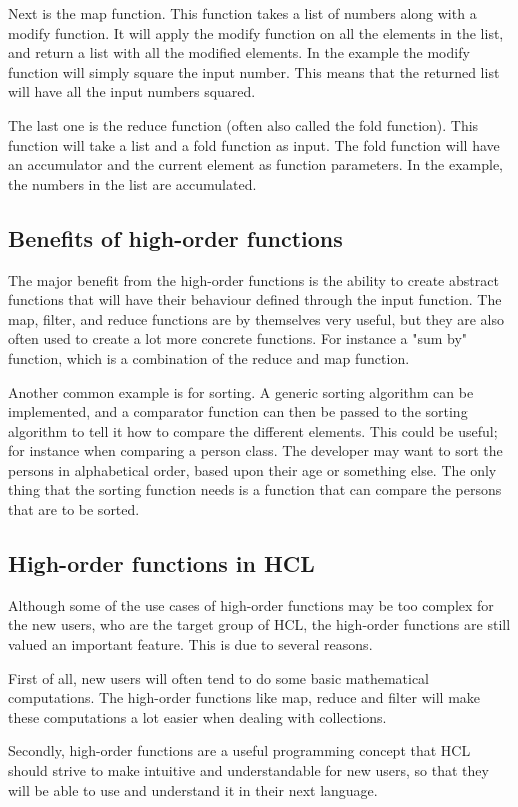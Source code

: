 Next is the map function. 
This function takes a list of numbers along with a modify function. 
It will apply the modify function on all the elements in the list, and return a list with all the modified elements.
In the example the modify function will simply square the input number. 
This means that the returned list will have all the input numbers squared.

The last one is the reduce function (often also called the fold function).
This function will take a list and a fold function as input. 
The fold function will have an accumulator and the current element as function parameters.
In the example, the numbers in the list are accumulated.

\subsection{Benefits of high-order functions}
The major benefit from the high-order functions is the ability to create abstract functions that will have their behaviour defined through the input function. 
The map, filter, and reduce functions are by themselves very useful, but they are also often used to create a lot more concrete functions. 
For instance a "sum by" function, which is a combination of the reduce and map function. 

Another common example is for sorting. 
A generic sorting algorithm can be implemented, and a comparator function can then be passed to the sorting algorithm to tell it how to compare the different elements.
This could be useful; for instance when comparing a person class. 
The developer may want to sort the persons in alphabetical order, based upon their age or something else. 
The only thing that the sorting function needs is a function that can compare the persons that are to be sorted.

\subsection{High-order functions in HCL}\label{subsec:hofhcl}
Although some of the use cases of high-order functions may be too complex for the new users, who are the target group of HCL, the high-order functions are still valued an important feature.
This is due to several reasons.

First of all, new users will often tend to do some basic mathematical computations. 
The high-order functions like map, reduce and filter will make these computations a lot easier when dealing with collections. 

Secondly, high-order functions are a useful programming concept that HCL should strive to make intuitive and understandable for new users, so that they will be able to use and understand it in their next language.